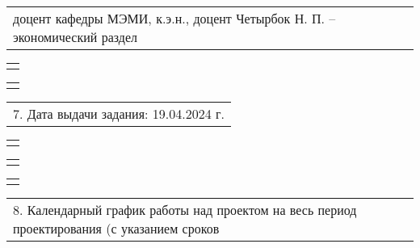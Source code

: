 \documentclass[12pt, А4, twoside]{article}
\begin{document}
\begin{FlushLeft}
		\vspace{-0.1 cm}
		
		\begin{tabular}{p{17.25cm}}
			\hspace{0.3cm} \textsf{доцент кафедры МЭМИ, к.э.н., доцент Четырбок Н. П.} \hspace{0.5cm} \textsf{{--} экономический раздел}\vspace{0pt} \hline \\
		\end{tabular}
		
		
		\begin{tabular}{p{17.25cm}}
			\vspace{0pt} \hline \\
		\end{tabular}
		
		\begin{tabular}{p{17.25cm}}
			\vspace{0pt} \hline \\
		\end{tabular}
		
		\begin{tabular}{p{17.25cm}}
			\textsf{7. Дата выдачи задания: 19.04.2024 г.} \vspace{0pt} \hline \\
		\end{tabular}
		
		\vspace{-0.1 cm}
		
		\begin{tabular}{p{17.25cm}}
			\vspace{0pt} \hline \\
		\end{tabular}
		
		\begin{tabular}{p{17.25cm}}
			\vspace{0pt} \hline  \\
		\end{tabular}
		
		\begin{tabular}{p{17.25cm}}
			\vspace{0pt} \hline \\
		\end{tabular}
		
		\vspace{-0.1 cm}
		
		\begin{tabular}{p{17.25cm}}
			\textsf{8. Календарный график работы над проектом на весь период проектирования (с указанием сроков} \vspace{0pt} \hline \\
		\end{tabular}
		

\end{FlushLeft}
\end{document}
